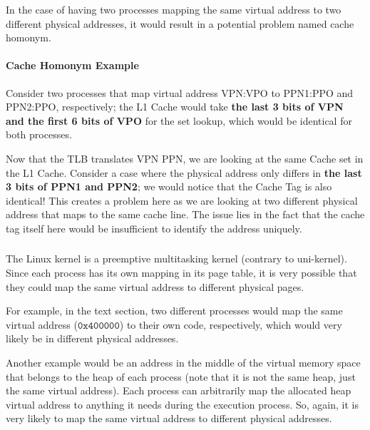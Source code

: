 \documentclass[12pt]{article}
\begin{document}
In the case of having two processes mapping the same virtual address to two different physical addresses, it would result in a potential problem named cache homonym. 

\paragraph*{Cache Homonym Example}

Consider two processes that map virtual address VPN:VPO to PPN1:PPO and PPN2:PPO, respectively; the L1 Cache would take \textbf{the last 3 bits of VPN and the first 6 bits of VPO} for the set lookup, which would be identical for both processes.

Now that the TLB translates VPN \textrightarrow{} PPN, we are looking at the same Cache set in the L1 Cache. Consider a case where the physical address only differs in \textbf {the last 3 bits of PPN1 and PPN2}; we would notice that the Cache Tag is also identical! This creates a problem here as we are looking at two different physical address that maps to the same cache line. The issue lies in the fact that the cache tag itself here would be insufficient to identify the address uniquely.

\subsubsection{}

The Linux kernel is a preemptive multitasking kernel (contrary to uni-kernel). Since each process has its own mapping in its page table, it is very possible that they could map the same virtual address to different physical pages. 

For example, in the text section, two different processes would map the same virtual address ($\mathtt{0x400000}$) to their own code, respectively, which would very likely be in different physical addresses. 

Another example would be an address in the middle of the virtual memory space that belongs to the heap of each process (note that it is not the same heap, just the same virtual address). Each process can arbitrarily map the allocated heap virtual address to anything it needs during the execution process. So, again, it is very likely to map the same virtual address to different physical addresses.

\subsection{}
\end{document}

